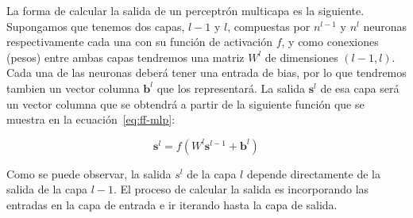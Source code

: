 La forma de calcular la salida de un perceptrón multicapa es la siguiente. Supongamos que tenemos dos capas, $l-1$ y $l$, compuestas por $n^{l-1}$ y $n^l$ neuronas respectivamente cada una con su función de activación $f$, y como conexiones (pesos) entre ambas capas tendremos una matriz $W^l$ de dimensiones $(l-1, l)$. Cada una de las neuronas deberá tener una entrada de bias, por lo que tendremos tambien un vector columna $\mathbf{b}^l$ que los representará. La salida $\mathbf{s}^l$ de esa capa será un vector columna que se obtendrá a partir de la siguiente función que se muestra en la ecuación~\ref{eq:ff-mlp}:

\begin{equation}
	\mathbf{s}^l = f(W^l \mathbf{s}^{l-1} + \mathbf{b}^l)
	\label{eq:ff-mlp}
\end{equation}

Como se puede observar, la salida $s^l$ de la capa $l$ depende directamente de la salida de la capa $l - 1$. El proceso de calcular la salida es incorporando las entradas en la capa de entrada e ir iterando hasta la capa de salida.

